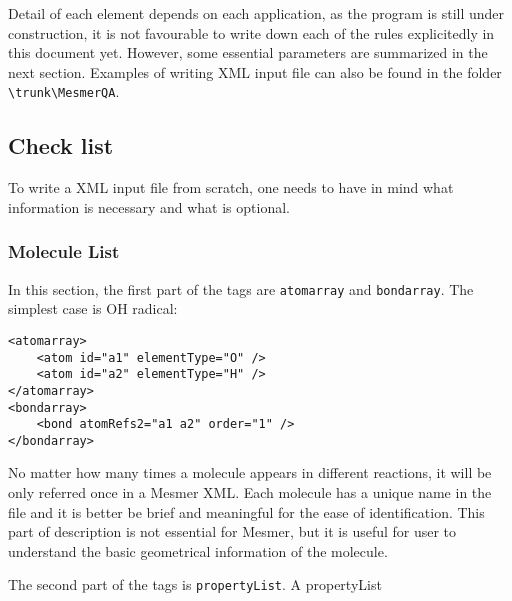 Detail of each element depends on each application, as the program is still under construction, it is not favourable to write down each of the rules explicitedly in this document yet. However, some essential parameters are summarized in the next section. Examples of writing XML input file can also be found in the folder \verb|\trunk\MesmerQA|. 

\subsection{Check list}\label{sec:CheckListXML}

To write a XML input file from scratch, one needs to have in mind what information is necessary and what is optional.

\subsubsection{Molecule List}\label{sec:moleculeList}

In this section, the first part of the tags are \verb|atomarray| and \verb|bondarray|. The simplest case is OH radical:

\begin{verbatim}
<atomarray>
    <atom id="a1" elementType="O" />
    <atom id="a2" elementType="H" />
</atomarray>
<bondarray>
    <bond atomRefs2="a1 a2" order="1" />
</bondarray>
\end{verbatim}

No matter how many times a molecule appears in different reactions, it will be only referred once in a Mesmer XML. Each molecule has a unique name in the file and it is better be brief and meaningful for the ease of identification. This part of description is not essential for Mesmer, but it is useful for user to understand the basic geometrical information of the molecule.

The second part of the tags is \verb|propertyList|. A propertyList 

